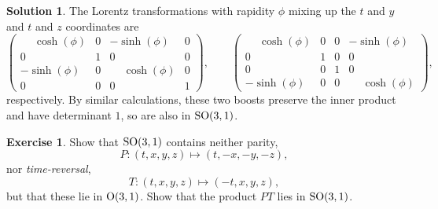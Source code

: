 \documentclass[11pt, a4paper]{report}
\theoremstyle{definition}
\newtheorem{exercise}{Exercise}[part]
\newtheorem{solution}{Solution}[part]
\newenvironment{ex}{\begin{exercise}}{\end{exercise}\pagebreak[1]}
\newenvironment{sol}{\begin{solution}}{\end{solution}\pagebreak[3]}
\renewcommand*{\O}{\ensuremath\text{O}}
\newcommand*{\SO}{\ensuremath\text{SO}}
\begin{document}
\begin{sol}
The Lorentz transformations with rapidity $\phi$ mixing up the $t$ and $y$ and $t$ and $z$ coordinates are
\[
    \begin{pmatrix}
        \phantom{-}\cosh(\phi) & 0 & -\sinh(\phi)           & 0 \\
        0                      & 1 & 0                      & 0 \\
        -\sinh(\phi)           & 0 & \phantom{-}\cosh(\phi) & 0 \\
        0                      & 0 & 0                      & 1
    \end{pmatrix}, \qquad
    \begin{pmatrix}
        \phantom{-}\cosh(\phi) & 0 & 0 & -\sinh(\phi) \\
        0                      & 1 & 0 & 0 \\
        0                      & 0 & 1 & 0 \\
        -\sinh(\phi)           & 0 & 0 & \phantom{-}\cosh(\phi)
    \end{pmatrix},
\]
respectively.
By similar calculations, these two boosts preserve the inner product and have determinant $1$, so are also in $\SO(3, 1)$.

\end{sol}

\begin{ex}

Show that $\SO(3, 1)$ contains neither parity,
\[
    P: (t, x, y, z) \mapsto (t, -x, -y, -z),
\]
nor \emph{time-reversal},
\[
    T: (t, x, y, z) \mapsto (-t, x, y, z),
\]
but that these lie in $\O(3, 1)$. Show that the product $PT$ lies in $\SO(3, 1)$.

\end{ex}
\end{document}
